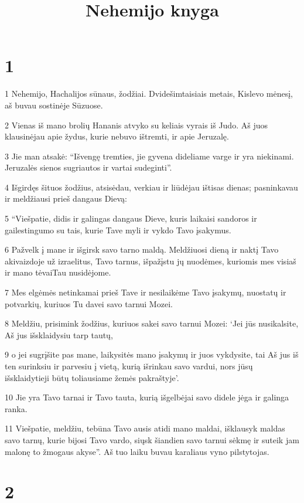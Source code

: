 

\title{Nehemijo knyga}

\chapter{1}


\par 1 Nehemijo, Hachalijos sūnaus, žodžiai. Dvidešimtaisiais metais, Kislevo mėnesį, aš buvau sostinėje Sūzuose. 
\par 2 Vienas iš mano brolių Hananis atvyko su keliais vyrais iš Judo. Aš juos klausinėjau apie žydus, kurie nebuvo ištremti, ir apie Jeruzalę. 
\par 3 Jie man atsakė: “Išvengę tremties, jie gyvena dideliame varge ir yra niekinami. Jeruzalės sienos sugriautos ir vartai sudeginti”. 
\par 4 Išgirdęs šituos žodžius, atsisėdau, verkiau ir liūdėjau ištisas dienas; pasninkavau ir meldžiausi prieš dangaus Dievą: 
\par 5 “Viešpatie, didis ir galingas dangaus Dieve, kuris laikaisi sandoros ir gailestingumo su tais, kurie Tave myli ir vykdo Tavo įsakymus. 
\par 6 Pažvelk į mane ir išgirsk savo tarno maldą. Meldžiuosi dieną ir naktį Tavo akivaizdoje už izraelitus, Tavo tarnus, išpažįstu jų nuodėmes, kuriomis mes visi­aš ir mano tėvai­Tau nusidėjome. 
\par 7 Mes elgėmės netinkamai prieš Tave ir nesilaikėme Tavo įsakymų, nuostatų ir potvarkių, kuriuos Tu davei savo tarnui Mozei. 
\par 8 Meldžiu, prisimink žodžius, kuriuos sakei savo tarnui Mozei: ‘Jei jūs nusikalsite, Aš jus išsklaidysiu tarp tautų, 
\par 9 o jei sugrįšite pas mane, laikysitės mano įsakymų ir juos vykdysite, tai Aš jus iš ten surinksiu ir parvesiu į vietą, kurią išrinkau savo vardui, nors jūsų išsklaidytieji būtų toliausiame žemės pakraštyje’. 
\par 10 Jie yra Tavo tarnai ir Tavo tauta, kurią išgelbėjai savo didele jėga ir galinga ranka. 
\par 11 Viešpatie, meldžiu, tebūna Tavo ausis atidi mano maldai, išklausyk maldas savo tarnų, kurie bijosi Tavo vardo, siųsk šiandien savo tarnui sėkmę ir suteik jam malonę to žmogaus akyse”. Aš tuo laiku buvau karaliaus vyno pilstytojas.


\chapter{2}

